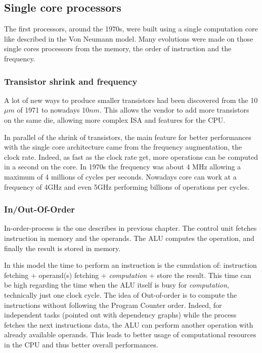 \subsection{Single core processors}
The first processors, around the 1970s, were built using a single computation core like described in the Von Neumann model. 
Many evolutions were made on those single cores processors from the memory, the order of instruction and the frequency.

\subsubsection{Transistor shrink and frequency}
A lot of new ways to produce smaller transistors had been discovered from the 10$\mu m$ of 1971 to nowadays 10$nm$.
This allows the vendor to add more transistors on the same die, allowing more complex ISA and features for the CPU. 

In parallel of the shrink of transistors, the main feature for better performances with the single core architecture came from the frequency augmentation, the clock rate. 
Indeed, as fast as the clock rate get, more operations can be computed in a second on the core. 
In 1970s the frequency was about 4 MHz allowing a maximum of 4 millions of cycles per seconds. 
Nowadays core can work at a frequency of 4GHz and even 5GHz performing billions of operations per cycles. 

\subsubsection{In/Out-Of-Order} 
In-order-process is the one describes in previous chapter. 
The control unit fetches instruction in memory and the operands. The ALU computes the operation, and finally the result is stored in memory.

In this model the time to perform an instruction is the cumulation of: instruction fetching + operand(s) fetching + \textit{computation} + store the result.
This time can be high regarding the time when the ALU itself is busy for \textit{computation}, technically just one clock cycle. 
The idea of Out-of-order is to compute the instructions without following the Program Counter order. 
Indeed, for independent tasks (pointed out with dependency graphs) while the process fetches the next instructions data, the ALU can perform another operation with already available operands.
This leads to better usage of computational resources in the CPU and thus better overall performances. 

